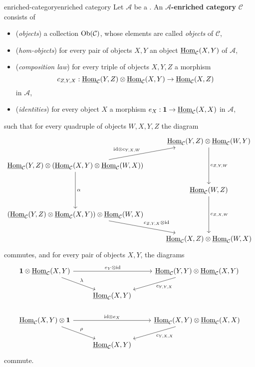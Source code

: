 \begin{topic}{enriched-category}{enriched category}
    Let $\mathcal{A}$ be a . An \textbf{$\mathcal{A}$-enriched category} $\mathcal{C}$ consists of
    \begin{itemize}
        \item (\textit{objects}) a collection $\textup{Ob}(\mathcal{C})$, whose elements are called \textit{objects} of $\mathcal{C}$,
        \item (\textit{hom-objects}) for every pair of objects $X, Y$ an object $\operatorname{\underline{Hom}}_\mathcal{C}(X, Y)$ of $\mathcal{A}$,
        \item (\textit{composition law}) for every triple of objects $X, Y, Z$ a morphism
        \[ c_{Z, Y, X} : \operatorname{\underline{Hom}}_\mathcal{C}(Y, Z) \otimes \operatorname{\underline{Hom}}_\mathcal{C}(X, Y) \to \operatorname{\underline{Hom}}_\mathcal{C}(X, Z) \]
        in $\mathcal{A}$,
        \item (\textit{identities}) for every object $X$ a morphism $e_X : \textbf{1} \to \operatorname{\underline{Hom}}_\mathcal{C}(X, X)$ in $\mathcal{A}$,
    \end{itemize}
    such that for every quadruple of objects $W, X, Y, Z$ the diagram
    \[ \begin{tikzcd}
        & \iHom_\mathcal{C}(Y, Z) \otimes \iHom_\mathcal{C}(W, Y) \arrow{dd}{c_{Z, Y, W}} \\ \iHom_\mathcal{C}(Y, Z) \otimes \left(\iHom_\mathcal{C}(X, Y) \otimes \iHom_\mathcal{C}(W, X)\right) \arrow{ur}{\id \otimes c_{Y, X, W}} \arrow{dd}{\alpha} & \\ & \iHom_\mathcal{C}(W, Z) \arrow{dd}{c_{Z, X, W}} \\ \left(\iHom_\mathcal{C}(Y, Z) \otimes \iHom_\mathcal{C}(X, Y)\right) \otimes \iHom_\mathcal{C}(W, X) \arrow{dr}{c_{Z, Y, X} \otimes \id} & \\ & \iHom_\mathcal{C}(X, Z) \otimes \iHom_\mathcal{C}(W, X)
    \end{tikzcd} \]
    commutes, and for every pair of objects $X, Y$, the diagrams
    \[ \begin{tikzcd}
        \textbf{1} \otimes \iHom_\mathcal{C}(X, Y) \arrow{rr}{e_Y \otimes \id} \arrow{dr}{\lambda} && \iHom_\mathcal{C}(Y, Y) \otimes \iHom_\mathcal{C}(X, Y) \arrow{dl}{c_{Y, Y, X}} \\ & \iHom_\mathcal{C}(X, Y) & \\
        \iHom_\mathcal{C}(X, Y) \otimes \textbf{1} \arrow{rr}{\id \otimes e_X} \arrow{dr}{\rho} && \iHom_\mathcal{C}(X, Y) \otimes \iHom_\mathcal{C}(X, X) \arrow{dl}{c_{Y, X, X}} \\ & \iHom_\mathcal{C}(X, Y) &       
    \end{tikzcd} \]
    commute.
\end{topic}

